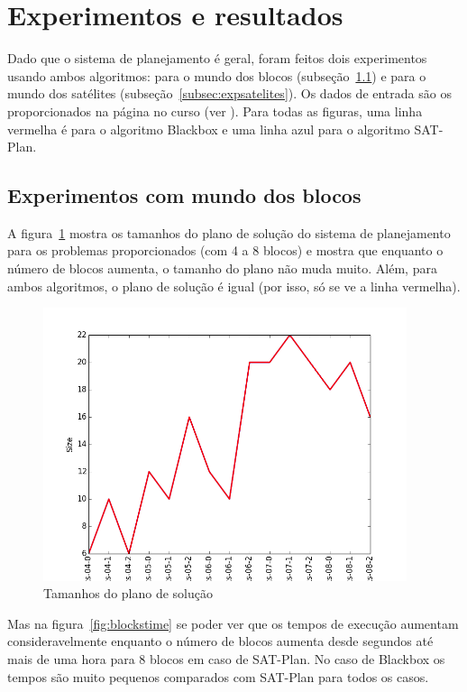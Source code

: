 \section{Experimentos e resultados} 

Dado que o sistema de planejamento é geral, foram feitos dois experimentos usando ambos algoritmos: para o mundo dos blocos (subseção~\ref{subsec:expblocos}) e para o mundo dos satélites (subseção~\ref{subsec:expsatelites}). Os dados de entrada são os proporcionados na página no curso (ver \cite{LabIA15}). Para todas as figuras, uma linha vermelha é para o algoritmo Blackbox e uma linha azul para o algoritmo SAT-Plan.

\subsection{Experimentos com mundo dos blocos}
\label{subsec:expblocos}
	A figura~\ref{fig:blockssize} mostra os tamanhos do plano de solução do sistema de planejamento para os problemas proporcionados (com 4 a 8 blocos) e mostra que enquanto o número de blocos aumenta, o tamanho do plano não muda muito. Além, para ambos algoritmos, o plano de solução é igual (por isso, só se ve a linha vermelha).
		\begin{figure}[H]
			\centering
			\includegraphics[height=8cm]{images/blocks_size}
			\caption{Tamanhos do plano de solução}
			\label{fig:blockssize}
		\end{figure}
	Mas na figura~\ref{fig:blockstime} se poder ver que os tempos de execução aumentam consideravelmente enquanto o número de blocos aumenta desde segundos até mais de uma hora para 8 blocos em caso de SAT-Plan. No caso de Blackbox os tempos são muito pequenos comparados com SAT-Plan para todos os casos.
